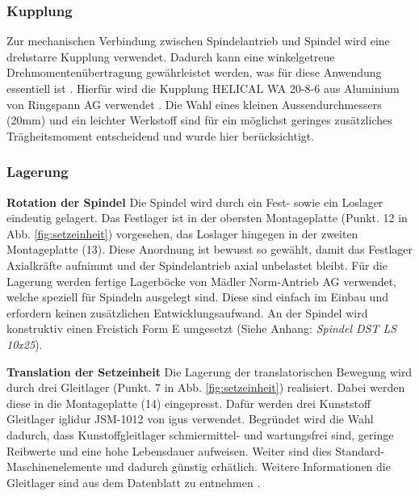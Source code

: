 \subsubsection{Kupplung}
Zur mechanischen Verbindung zwischen Spindelantrieb und Spindel wird eine drehstarre Kupplung verwendet. Dadurch kann eine winkelgetreue Drehmomentenübertragung gewährleistet werden, was für diese Anwendung essentiell ist \cite{dubbel}. Hierfür wird die Kupplung HELICAL WA 20-8-6 aus Aluminium von Ringspann AG verwendet \cite{helical}. Die Wahl eines kleinen Aussendurchmessers (20mm) und ein leichter Werkstoff sind für ein möglichst geringes zusätzliches Trägheitsmoment entscheidend und wurde hier berücksichtigt.

\subsubsection{Lagerung}
\textbf{Rotation der Spindel}
\newline
Die Spindel wird durch ein Fest- sowie ein Loslager eindeutig gelagert. Das Festlager ist in der obersten Montageplatte (Punkt. 12 in Abb. \ref{fig:setzeinheit}) vorgesehen, das Loslager hingegen in der zweiten Montageplatte (13). Diese Anordnung ist bewusst so gewählt, damit das Festlager Axialkräfte aufnimmt und der Spindelantrieb axial unbelastet bleibt. Für die Lagerung werden fertige Lagerböcke von Mädler Norm-Antrieb AG verwendet, welche speziell für Spindeln ausgelegt sind. Diese sind einfach im Einbau und erfordern keinen zusätzlichen Entwicklungsaufwand. An der Spindel wird konstruktiv einen Freistich Form E umgesetzt (Siehe Anhang: \textit{Spindel DST LS 10x25})\cite{vsm}.
\newline

\textbf{Translation der Setzeinheit}
\newline
Die Lagerung der translatorischen Bewegung wird durch drei Gleitlager (Punkt. 7 in Abb. \ref{fig:setzeinheit}) realisiert. Dabei werden diese in die Montageplatte (14) eingepresst. Dafür werden drei Kunststoff Gleitlager iglidur JSM-1012 von igus verwendet. Begründet wird die Wahl dadurch, dass Kunstoffgleitlager schmiermittel- und wartungsfrei sind, geringe Reibwerte und eine hohe Lebensdauer aufweisen. Weiter sind dies Standard-Maschinenelemente und dadurch günstig erhätlich. Weitere Informationen die Gleitlager sind aus dem Datenblatt zu entnehmen \cite{igusJSM}.


